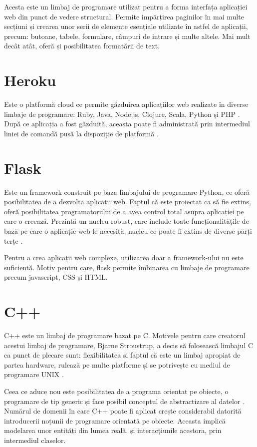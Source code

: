 	Acesta este un limbaj de programare utilizat pentru a forma interfața aplicației web din punct de vedere structural. Permite impărțirea paginilor în mai multe secțiuni și crearea unor serii de elemente esențiale utilizate în astfel de aplicații, precum: butoane, tabele, formulare, câmpuri de intrare și multe altele. Mai mult decât atât, oferă și posibilitatea formatării de text.  

\section{Heroku}

	Este o platformă cloud ce permite găzduirea aplicațiilor web realizate în diverse limbaje de programare: Ruby, Java, Node.js, Clojure, Scala, Python și PHP \cite{heroku}. După ce aplicația a fost găzduită, aceasta poate fi administrată prin intermediul liniei de comandă pusă la dispoziție de platformă \cite{heroku}.

\section{Flask}

	Este un framework construit pe baza limbajului de programare Python, ce oferă posibilitatea de a dezvolta aplicații web. Faptul că este proiectat ca să fie extins, oferă posibilitatea programatorului de a avea control total asupra aplicației pe care o creează. Prezintă un nucleu robust, care include toate funcționalitățile de bază pe care o aplicație web le necesită, nucleu ce poate fi extins de diverse părți terțe \cite{flask}.

	Pentru a crea aplicații web complexe, utilizarea doar a framework-ului nu este suficientă. Motiv pentru care, flask permite îmbinarea cu limbaje de programare precum javascript, CSS și HTML.

\section{C++}

	C++ este un limbaj de programare bazat pe C. Motivele pentru care creatorul acestui limbaj de programare, Bjarne Stroustrup, a decis să folosească limbajul C ca punct de plecare sunt: flexibilitatea si faptul că este un limbaj apropiat de partea hardware, rulează pe multe platforme și se potrivește cu mediul de programare UNIX \cite{c++}.

	Ceea ce aduce nou este posibilitatea de a programa orientat pe obiecte, o programare de tip generic și face posibil conceptul de abstractizare al datelor \cite{c++}. Numărul de domenii în care C++ poate fi aplicat crește considerabil datorită introducerii noțunii de programare orientată pe obiecte. Aceasta implică modelarea unor entități din lumea reală, și interacțiunile acestora, prin intermediul claselor. 


